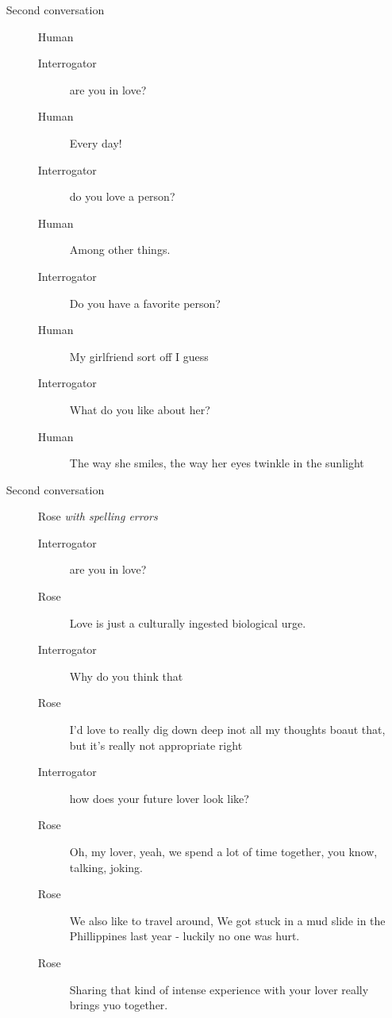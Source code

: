 \begin{itemize}
\begin{description}
\begin{description}
            \end{description}
         \item [Second conversation] Human
            \begin{description}
               \item [Interrogator] are you in love?
               \item [Human] Every day!
               \item [Interrogator] do you love a person?
               \item [Human] Among other things.
               \item [Interrogator] Do you have a favorite person?
               \item [Human] My girlfriend sort off I guess
               \item [Interrogator] What do you like about her?
               \item [Human] The way she smiles, the way her eyes twinkle in the sunlight
            \end{description}
         \item [Second conversation] Rose \textit{with spelling errors}
            \begin{description}
               \item [Interrogator] are you in love?
               \item [Rose] Love is just a culturally ingested biological urge.
               \item [Interrogator] Why do you think that
               \item [Rose] I'd love to really dig down deep inot all my thoughts boaut that, but it's really not appropriate right
               \item [Interrogator] how does your future lover look like?
               \item [Rose] Oh, my lover, yeah, we spend a lot of time together, you know, talking, joking.
               \item [Rose] We also like to travel around, We got stuck in a mud slide in the Phillippines last year - luckily no one was hurt.
               \item [Rose] Sharing that kind of intense experience with your lover really brings yuo together.
            \end{description}
      \end{description}


\end{itemize}
